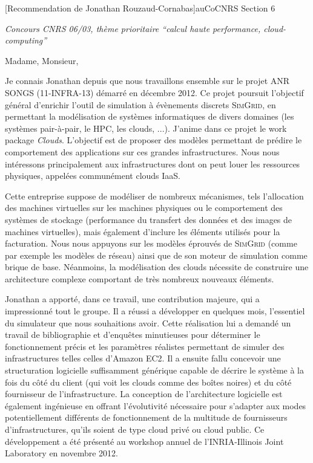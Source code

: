 \documentclass[a4paper,10pt]{article}
\begin{document}


\begin{letter}[Recommendation de Jonathan Rouzaud-Cornabas]{au}{CoCNRS Section 6}

\textit{Concours CNRS 06/03,  thème  prioritaire  ``calcul haute  performance,
  cloud-computing''}

Madame, Monsieur,


Je connais Jonathan depuis que nous travaillons ensemble sur le projet ANR SONGS
(11-INFRA-13) démarré en  décembre 2012.  Ce projet  poursuit l'objectif général
d'enrichir  l'outil de  simulation  à évènements  discrets \textsc{SimGrid},  en
permettant la  modélisation de  systèmes informatiques  de divers  domaines (les
systèmes pair-à-pair, le  HPC, les clouds, ...). J'anime dans  ce projet le work
package \textit{Clouds}.  L'objectif  est de proposer des  modèles permettant de
prédire le comportement  des applications sur ces  grandes infrastructures. Nous
nous  intéressons principalement  aux  infrastructures dont  on  peut louer  les
ressources  physiques,  appelées  communément  clouds  IaaS.   

Cette entreprise suppose de modéliser  de nombreux mécanismes, tels l'allocation
des  machines virtuelles  sur  les  machines physiques  ou  le comportement  des
systèmes de  stockage (performance  du transfert  des données  et des  images de
machines virtuelles),  mais également  d'inclure les  éléments utilisés  pour la
facturation. Nous  nous appuyons  sur les  modèles éprouvés  de \textsc{SimGrid}
(comme par exemple les modèles de réseau)  ainsi que de son moteur de simulation
comme  brique  de base.  Néanmoins,  la  modélisation  des clouds  nécessite  de
construire une architecture complexe comportant de très nombreux nouveaux
éléments.

Jonathan  a  apporté,   dans  ce  travail,  une  contribution   majeure,  qui  a
impressionné  tout le  groupe.   Il  a réussi  a  développer  en quelques  mois,
l'essentiel du  simulateur que nous  souhaitions avoir. Cette réalisation  lui a
demandé un travail de bibliographie et d'enquêtes minutieuses pour déterminer le
fonctionnement  précis et  les paramètres  réalistes permettant  de simuler  des
infrastructures telles  celles d'Amazon  EC2. Il a  ensuite fallu  concevoir une
structuration logicielle suffisamment générique capable  de décrire le système à
la fois du  côté du client (qui voit  les clouds comme des boîtes  noires) et du
côté  fournisseur   de  l'infrastructure.    La  conception   de  l'architecture
logicielle  est également  ingénieuse en  offrant l'évolutivité  nécessaire pour
s'adapter aux  modes potentiellement différents  de fonctionnement de la multitude
de fournisseurs d'infrastructures, qu'ils soient de type cloud privé ou cloud public. 
Ce développement a été présenté au workshop annuel de l'INRIA-Illinois Joint 
Laboratory en novembre 2012.


\end{letter}
\end{document}
